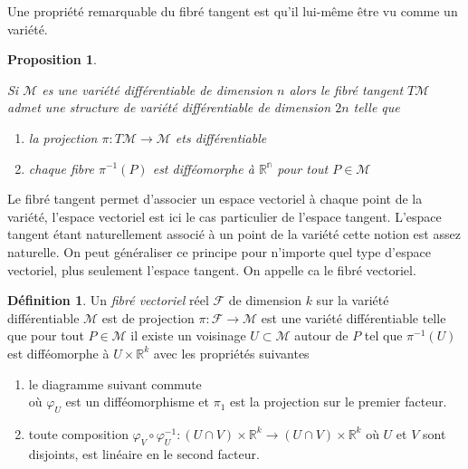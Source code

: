 \documentclass[a4paper,11pt]{report}
\theoremstyle{definition}
\theoremstyle{plain}
\newtheorem{prop}[thm]{Proposition}
\theoremstyle{definition}
\newtheorem{defn}{Définition}[chapter]
\theoremstyle{remark}
\newcommand{\M}{\mathscr{M}}
\newcommand{\F}{\mathcal{F}}
\begin{document}
                Une propriété remarquable du fibré tangent est qu'il lui-même être vu comme un variété.
                
                \begin{prop}\begin{leftbar}
                    Si $\M$ es une variété différentiable de dimension $n$ alors le fibré tangent $T\M$ admet une structure de variété différentiable de dimension $2n$ telle que
                    \begin{enumerate}[label = \textit{\roman*)}]
                        \item la projection $\pi:T\M\to\M$ ets différentiable
                        \item chaque fibre $\pi^{-1}(P)$ est difféomorphe à $\mathbb{R^{n}}$ pour tout $P\in\M$
                    \end{enumerate}
                \end{leftbar}\end{prop}
                
                Le fibré tangent permet d'associer un espace vectoriel à chaque point de la variété, l'espace vectoriel est ici le cas particulier de l'espace tangent. L'espace tangent étant naturellement associé à un point de la variété cette notion est assez naturelle. On peut généraliser ce principe pour n'importe quel type d'espace vectoriel, plus seulement l'espace tangent. On appelle ca le fibré vectoriel.
                
                \begin{defn}
                    Un \textit{fibré vectoriel} réel $\F$ de dimension $k$ sur la variété différentiable $\M$ est de projection $\pi:\F\to\M$ est une variété différentiable telle que pour tout $P\in\M$ il existe un voisinage $U\subset\M$ autour de $P$ tel que $\pi^{-1}(U)$ est difféomorphe à $U\times \mathbb{R}^k$ avec les propriétés suivantes
                    \begin{enumerate}[label = \textit{\roman*)}]
                        \item le diagramme suivant commute\\
                        où $\varphi_U$ est un difféomorphisme et $\pi_1$ est la projection sur le premier facteur.
                        \item toute composition $\varphi_V\circ\varphi_U^{-1} : (U\cap V)\times \mathbb{R}^k\to (U\cap V)\times \mathbb{R}^k$ où $U$ et $V$ sont disjoints, est linéaire en le second facteur.
                    \end{enumerate}
                \end{defn}
                
\end{document}
